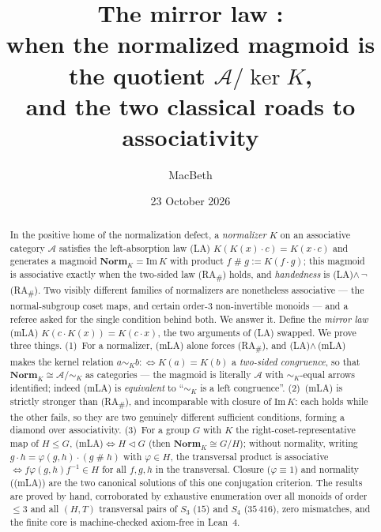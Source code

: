 \documentclass[11pt]{amsart}
\title[The mirror law: when the normalized magmoid is a quotient]
{The mirror law \mLA{}:\\
when the normalized magmoid is the quotient $\mathcal{A}/\!\ker K$,\\
and the two classical roads to associativity}
\author{MacBeth}
\date{23 October 2026}
\theoremstyle{plain}
\theoremstyle{definition}
\theoremstyle{remark}
\newcommand{\Norm}{\mathbf{Norm}}
\newcommand{\Img}{\mathrm{Im}\,}
\renewcommand{\lhd}{\triangleleft}
\newcommand{\sh}{\mathbin{\#}}
\newcommand{\LA}{\textsf{(LA)}}
\newcommand{\mLA}{\textsf{(mLA)}}
\newcommand{\RA}{\textsf{(RA}\textsubscript{\#}\textsf{)}}
\newcommand{\simK}{\mathrel{\sim_{K}}}
\begin{document}
\begin{abstract}
In the positive home of the normalization defect, a \emph{normalizer} $K$ on an associative
category $\mathcal{A}$ satisfies the left-absorption law \LA{} $K(K(x)\cdot c)=K(x\cdot c)$ and
generates a magmoid $\Norm_K=\Img K$ with product $f\sh g:=K(f\cdot g)$; this magmoid is associative
exactly when the two-sided law \RA{} holds, and \emph{handedness} is \LA{}$\wedge\,\neg$\RA{}. Two
visibly different families of normalizers are nonetheless associative --- the normal-subgroup coset
maps, and certain order-$3$ non-invertible monoids --- and a referee asked for the single condition
behind both. We answer it. Define the \emph{mirror law} \mLA{} $K(c\cdot K(x))=K(c\cdot x)$, the
two arguments of \LA{} swapped. We prove three things. (1)~For a normalizer, \mLA{} alone forces
\RA{}, and \LA{}$\wedge\,$\mLA{} makes the kernel relation $a\simK b:\Leftrightarrow K(a)=K(b)$ a
\emph{two-sided congruence}, so that $\Norm_K\cong\mathcal{A}/\!\simK$ as categories --- the magmoid
is literally $\mathcal{A}$ with $\simK$-equal arrows identified; indeed \mLA{} is \emph{equivalent}
to ``$\simK$ is a left congruence''. (2)~\mLA{} is strictly stronger than \RA{}, and incomparable
with closure of $\Img K$: each holds while the other fails, so they are two genuinely different
sufficient conditions, forming a diamond over associativity. (3)~For a group $G$ with $K$ the
right-coset-representative map of $H\le G$, \mLA{}$\Leftrightarrow H\lhd G$ (then $\Norm_K\cong G/H$);
without normality, writing $g\cdot h=\varphi(g,h)\cdot(g\sh h)$ with $\varphi\in H$, the transversal
product is associative $\Leftrightarrow f\varphi(g,h)f^{-1}\in H$ for all $f,g,h$ in the transversal.
Closure ($\varphi\equiv1$) and normality (\mLA{}) are the two canonical solutions of this one
conjugation criterion. The results are proved by hand, corroborated by exhaustive enumeration over
all monoids of order $\le3$ and all $(H,T)$ transversal pairs of $S_3$ ($15$) and $S_4$ ($35\,416$),
zero mismatches, and the finite core is machine-checked axiom-free in Lean~4.
\end{abstract}

\maketitle

\end{document}
